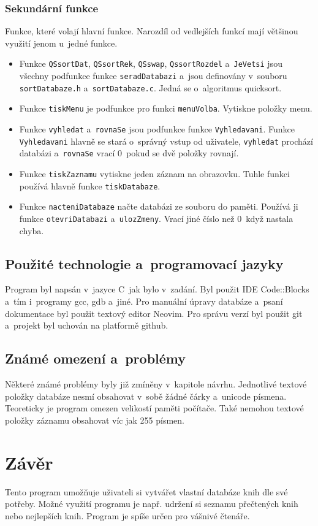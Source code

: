 \subsection{Sekundární funkce}
Funkce, které volají hlavní funkce. Narozdíl od vedlejších funkcí mají většinou využití jenom u~jedné funkce. 

\begin{itemize}
  \item Funkce \texttt{QSsortDat}, \texttt{QSsortRek}, \texttt{QSswap}, \texttt{QssortRozdel} a~\texttt{JeVetsi} jsou všechny podfunkce 
  funkce \texttt{seradDatabazi} a~jsou definovány v~souboru \texttt{sortDatabaze.h} a~\texttt{sortDatabaze.c}. Jedná se o~algoritmus 
  quicksort. 
  
  \item Funkce \texttt{tiskMenu} je podfunkce pro funkci \texttt{menuVolba}. Vytiskne položky menu.

  \item Funkce \texttt{vyhledat} a~\texttt{rovnaSe} jsou podfunkce funkce \texttt{Vyhledavani}. Funkce \texttt{Vyhledavani} 
  hlavně se stará o~správný vstup od uživatele, \texttt{vyhledat} prochází databázi a~\texttt{rovnaSe} vrací 0~pokud se 
  dvě položky rovnají.

  \item Funkce \texttt{tiskZaznamu} vytiskne jeden záznam na obrazovku. Tuhle funkci používá hlavně funkce \texttt{tiskDatabaze}. 

  \item Funkce \texttt{nacteniDatabaze} načte databázi ze souboru do paměti. Používá ji funkce \texttt{otevriDatabazi} 
  a~\texttt{ulozZmeny}. Vrací jiné číslo než 0~když nastala chyba. 

\end{itemize}

\section{Použité technologie a~programovací jazyky}
Program byl napsán v~jazyce C~jak bylo v~zadání. Byl použit IDE Code::Blocks a~tím i~programy gcc, gdb a~jiné. 
Pro manuální úpravy databáze a~psaní dokumentace byl použit textový editor Neovim. Pro 
správu verzí byl použit git a~projekt byl uchován na platformě github.

\section{Známé omezení a~problémy}
Některé známé problémy byly již zmíněny v~kapitole návrhu. Jednotlivé textové položky databáze nesmí obsahovat v~sobě 
žádné čárky a~unicode písmena. Teoreticky je program omezen velikostí paměti počítače. Také nemohou textové položky 
záznamu obsahovat víc jak 255 písmen. 

\chapter{Závěr}
Tento program umožňuje uživateli si vytvářet vlastní databáze knih dle své potřeby. Možné využití 
programu je např. udržení si seznamu přečtených knih nebo nejlepších knih. Program je spíše určen pro vášnivé čtenáře.
